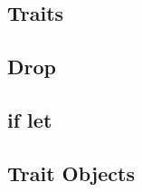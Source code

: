\subsection{Traits}
\label{sec:syntax_traits}


\subsection{Drop}
\label{sec:syntax_drop}


\subsection{if let}
\label{sec:syntax_iflet}


\subsection{Trait Objects}
\label{sec:syntax_traitObjects}

